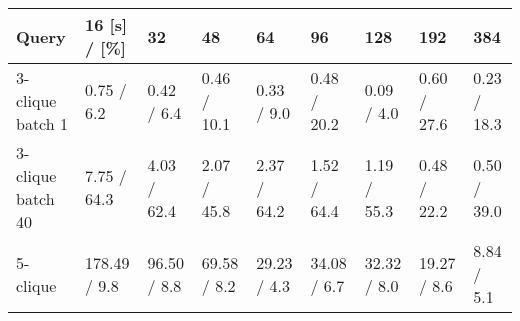 \begin{tabular}{lllllllll}
\toprule
             Query &  16 [s] / [\%] &           32 &           48 &           64 &           96 &          128 &          192 &          384 \\
\midrule
  3-clique batch 1 &    0.75 / 6.2 &   0.42 / 6.4 &  0.46 / 10.1 &   0.33 / 9.0 &  0.48 / 20.2 &   0.09 / 4.0 &  0.60 / 27.6 &  0.23 / 18.3 \\
 3-clique batch 40 &   7.75 / 64.3 &  4.03 / 62.4 &  2.07 / 45.8 &  2.37 / 64.2 &  1.52 / 64.4 &  1.19 / 55.3 &  0.48 / 22.2 &  0.50 / 39.0 \\
          5-clique &  178.49 / 9.8 &  96.50 / 8.8 &  69.58 / 8.2 &  29.23 / 4.3 &  34.08 / 6.7 &  32.32 / 8.0 &  19.27 / 8.6 &   8.84 / 5.1 \\
\bottomrule
\end{tabular}
